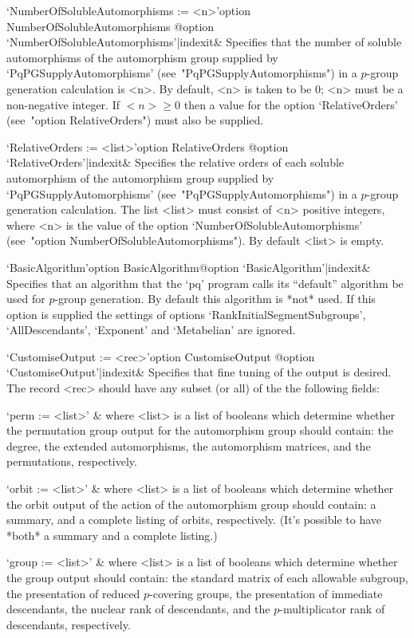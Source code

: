 \>`NumberOfSolubleAutomorphisms := <n>'{option NumberOfSolubleAutomorphisms}%
@{option `NumberOfSolubleAutomorphisms'|indexit}&
Specifies that the number of soluble automorphisms  of  the  automorphism
group           supplied           by           `PqPGSupplyAutomorphisms'
(see~"PqPGSupplyAutomorphisms") in a $p$-group generation calculation  is
<n>. By default, <n> is taken to be  $0$;  <n>  must  be  a  non-negative
integer. If $<n> \ge 0$ then a  value  for  the  option  `RelativeOrders'
(see~"option RelativeOrders") must also be supplied.

\>`RelativeOrders := <list>'{option RelativeOrders}%
@{option `RelativeOrders'|indexit}&
Specifies the  relative  orders  of  each  soluble  automorphism  of  the
automorphism     group     supplied     by      `PqPGSupplyAutomorphisms'
(see~"PqPGSupplyAutomorphisms") in a  $p$-group  generation  calculation.
The list <list> must consist of <n> positive integers, where <n>  is  the
value   of   the   option   `NumberOfSolubleAutomorphisms'   (see~"option
NumberOfSolubleAutomorphisms"). By default <list> is empty.

\>`BasicAlgorithm'{option BasicAlgorithm}@{option `BasicAlgorithm'|indexit}&
Specifies that an  algorithm that the `pq' program  calls its ``default''
algorithm be  used for $p$-group generation. By default this algorithm is
*not*  used.   If  this  option  is  supplied  the  settings  of  options
`RankInitialSegmentSubgroups',     `AllDescendants',    `Exponent'    and
`Metabelian' are ignored.

\>`CustomiseOutput := <rec>'{option CustomiseOutput}%
@{option `CustomiseOutput'|indexit}&
Specifies that fine tuning of the output is  desired.  The  record  <rec>
should have any subset (or all) of the the following fields:

\quad`perm := <list>' &
where  <list>  is  a  list  of  booleans  which  determine  whether   the
permutation group output for the automorphism group should  contain:  the
degree, the extended automorphisms, the automorphism  matrices,  and  the
permutations, respectively.

\quad`orbit := <list>' &
where <list> is a list of booleans  which  determine  whether  the  orbit
output of the action of the automorphism group should contain: a summary,
and a complete listing of orbits, respectively. (It's  possible  to  have
*both* a summary and a complete listing.)

\quad`group := <list>' &
where <list> is a list of booleans  which  determine  whether  the  group
output should contain: the standard matrix of  each  allowable  subgroup,
the presentation of reduced  $p$-covering  groups,  the  presentation  of
immediate  descendants,  the  nuclear  rank  of  descendants,   and   the
$p$-multiplicator rank of descendants, respectively.

